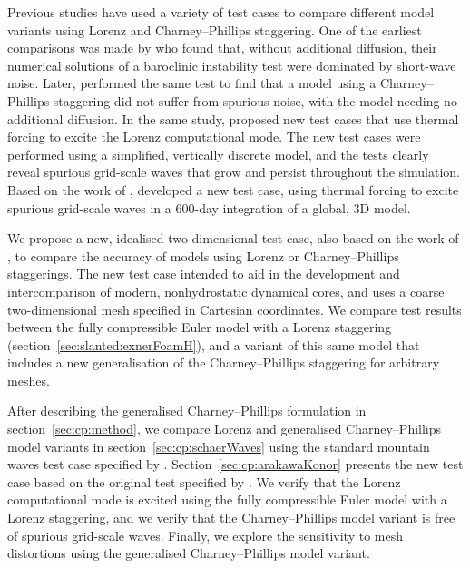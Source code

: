 Previous studies have used a variety of test cases to compare different model variants using Lorenz and Charney--Phillips staggering.
One of the earliest comparisons was made by \citet{arakawa-moorthi1988} who found that, without additional diffusion, their numerical solutions of a baroclinic instability test were dominated by short-wave noise.
Later, \citet{arakawa-konor1996} performed the same test to find that a model using a Charney--Phillips staggering did not suffer from spurious noise, with the model needing no additional diffusion.
In the same study, \citet{arakawa-konor1996} proposed new test cases that use thermal forcing to excite the Lorenz computational mode.
The new test cases were performed using a simplified, vertically discrete model, and the tests clearly reveal spurious grid-scale waves that grow and persist throughout the simulation.
Based on the work of \citet{arakawa-konor1996}, \citet{untch-hortal2004} developed a new test case, using thermal forcing to excite spurious grid-scale waves in a 600-day integration of a global, 3D model.

We propose a new, idealised two-dimensional test case, also based on the work of \citet{arakawa-konor1996}, to compare the accuracy of models using Lorenz or Charney--Phillips staggerings.  The new test case intended to aid in the development and intercomparison of modern, nonhydrostatic dynamical cores, and uses a coarse two-dimensional mesh specified in Cartesian coordinates.
We compare test results between the fully compressible Euler model with a Lorenz staggering (section~\ref{sec:slanted:exnerFoamH}), and a variant of this same model that includes a new generalisation of the Charney--Phillips staggering for arbitrary meshes.

After describing the generalised Charney--Phillips formulation in section~\ref{sec:cp:method}, we compare Lorenz and generalised Charney--Phillips model variants in section~\ref{sec:cp:schaerWaves} using the standard mountain waves test case specified by \citet{schaer2002}.
Section~\ref{sec:cp:arakawaKonor} presents the new test case based on the original test specified by \citet{arakawa-konor1996}.
We verify that the Lorenz computational mode is excited using the fully compressible Euler model with a Lorenz staggering, and we verify that the Charney--Phillips model variant is free of spurious grid-scale waves.  Finally, we explore the sensitivity to mesh distortions using the generalised Charney--Phillips model variant.





